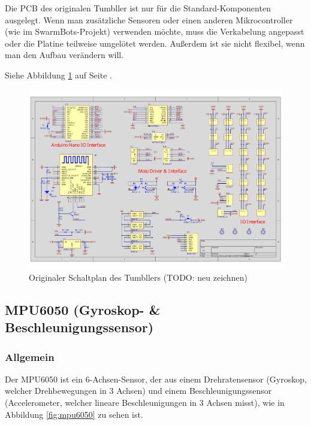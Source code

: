 Die PCB des originalen Tumbller ist nur für die Standard-Komponenten ausgelegt.
Wenn man zusätzliche Sensoren oder einen anderen Mikrocontroller (wie im SwarmBots-Projekt) verwenden möchte, muss die Verkabelung angepasst oder die Platine teilweise umgelötet werden.
Außerdem ist sie nicht flexibel, wenn man den Aufbau verändern will.

%
Siehe Abbildung \ref{fig:elegoo_tumbller_original_circuit} auf Seite \pageref{fig:elegoo_tumbller_original_circuit}.
%
\begin{figure}
    \includegraphics[width=\textwidth, center]{img/elegoo_tumbller_original_circuit.pdf}
    \caption{Originaler Schaltplan des Tumbllers (TODO: neu zeichnen)}
    \label{fig:elegoo_tumbller_original_circuit}
\end{figure}
%
\subsection{MPU6050 (Gyroskop- \& Beschleunigungssensor)}
%
\subsubsection{Allgemein}
Der MPU6050 ist ein 6-Achsen-Sensor, der aus einem Drehratensensor (Gyroskop, welcher Drehbewegungen in 3 Achsen) und einem Beschleunigungssensor (Accelerometer, welcher lineare Beschleunigungen in 3 Achsen misst), wie in Abbildung \ref{fig:mpu6050} zu sehen ist.
